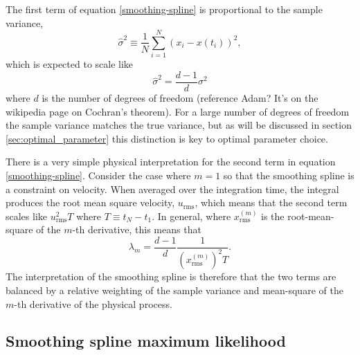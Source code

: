 \documentclass[10pt,journal]{IEEEtran}
\begin{document}
The first term of equation \ref{smoothing-spline} is proportional to the sample variance,
\begin{equation}
\label{sample_variance}
\hat{\sigma}^2  \equiv \frac{1}{N} \sum_{i=1}^{N} \left( x_i - x(t_i) \right) ^2,
\end{equation}
which is expected to scale like
\begin{equation}
\label{sample_variance_variance}
\hat{\sigma}^2 = \frac{d-1}{d} \sigma^2
\end{equation}
where $d$ is the number of degrees of freedom (reference Adam? It's on the wikipedia page on Cochran's theorem). For a large number of degrees of freedom the sample variance matches the true variance, but as will be discussed in section \ref{sec:optimal_parameter} this distinction is key to optimal parameter choice.

There is a very simple physical interpretation for the second term in equation \ref{smoothing-spline}. Consider the case where $m=1$ so that the smoothing spline is a constraint on velocity. When averaged over the integration time, the integral produces the root mean square velocity, $u_{\textrm{rms}}$, which means that the second term scales like $u_{\textrm{rms}}^2 T$ where $T\equiv t_N-t_1$. In general, where $x^{(m)}_{\textrm{rms}}$ is the root-mean-square of the $m$-th derivative, this means that
\begin{equation}
\label{lambda}
\lambda_m = \frac{d-1}{d} \frac{1}{ \left(x^{(m)}_{\textrm{rms}}\right)^2 T}.
\end{equation}
The interpretation of the smoothing spline is therefore that the two terms are balanced by a relative weighting of the sample variance and mean-square of the $m$-th derivative of the physical process.



\subsection{Smoothing spline maximum likelihood}
\end{document}
